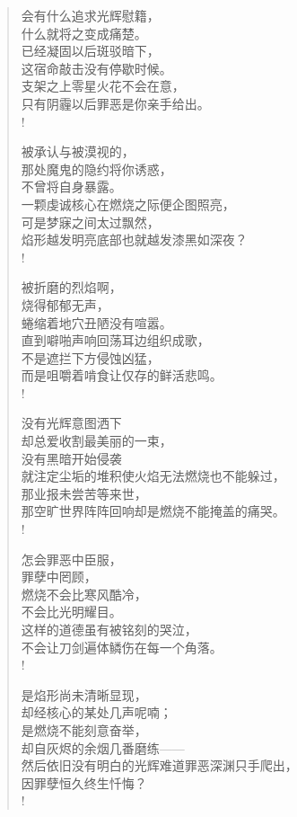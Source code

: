 \documentclass[UTF8, 12pt, a4paper]{ctexrep} %
\begin{document}
\begin{verse}

    会有什么追求光辉慰籍，\\
    什么就将之变成痛楚。\\
    已经凝固以后斑驳暗下，\\
    这宿命敲击没有停歇时候。\\
    支架之上零星火花不会在意，\\
    只有阴霾以后罪恶是你亲手给出。\\!

    被承认与被漠视的，\\
    那处魔鬼的隐约将你诱惑，\\
    不曾将自身暴露。\\
    一颗虔诚核心在燃烧之际便企图照亮，\\
    可是梦寐之间太过飘然，\\
    焰形越发明亮底部也就越发漆黑如深夜？\\!

    被折磨的烈焰啊，\\
    烧得郁郁无声，\\
    蜷缩着地穴丑陋没有喧嚣。\\
    直到噼啪声响回荡耳边组织成歌，\\
    不是遮拦下方侵蚀凶猛，\\
    而是咀嚼着啃食让仅存的鲜活悲鸣。\\!

    没有光辉意图洒下\\
    却总爱收割最美丽的一束，\\
    没有黑暗开始侵袭\\
    就注定尘垢的堆积使火焰无法燃烧也不能躲过，\\
    那业报未尝苦等来世，\\
    那空旷世界阵阵回响却是燃烧不能掩盖的痛哭。\\!

    怎会罪恶中臣服，\\
    罪孽中罔顾，\\
    燃烧不会比寒风酷冷，\\
    不会比光明耀目。\\
    这样的道德虽有被铭刻的哭泣，\\
    不会让刀剑遍体鳞伤在每一个角落。\\!

    是焰形尚未清晰显现，\\
    却经核心的某处几声呢喃；\\
    是燃烧不能刻意奋举，\\
    却自灰烬的余烟几番磨练——\\
    然后依旧没有明白的光辉难道罪恶深渊只手爬出，\\
    因罪孽恒久终生忏悔？\\!


\end{verse}
\end{document}

